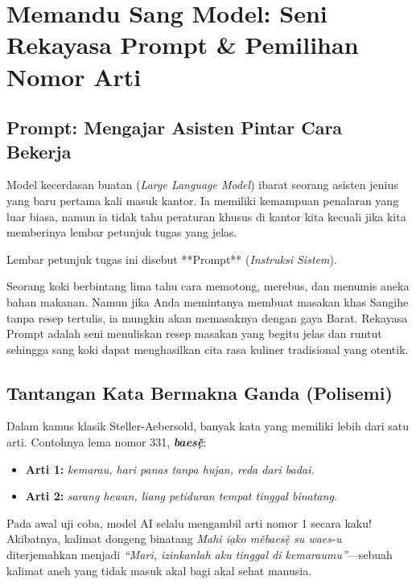 \chapter{Memandu Sang Model: Seni Rekayasa Prompt \& Pemilihan Nomor Arti}

\section{Prompt: Mengajar Asisten Pintar Cara Bekerja}
Model kecerdasan buatan (\textit{Large Language Model}) ibarat seorang asisten jenius yang baru pertama kali masuk kantor. Ia memiliki kemampuan penalaran yang luar biasa, namun ia tidak tahu peraturan khusus di kantor kita kecuali jika kita memberinya lembar petunjuk tugas yang jelas.

Lembar petunjuk tugas ini disebut **Prompt** (\textit{Instruksi Sistem}).

\begin{infobox}
Seorang koki berbintang lima tahu cara memotong, merebus, dan menumis aneka bahan makanan. Namun jika Anda memintanya membuat masakan khas Sangihe tanpa resep tertulis, ia mungkin akan memasaknya dengan gaya Barat. Rekayasa Prompt adalah seni menuliskan resep masakan yang begitu jelas dan runtut sehingga sang koki dapat menghasilkan cita rasa kuliner tradisional yang otentik.
\end{infobox}

\section{Tantangan Kata Bermakna Ganda (Polisemi)}
Dalam kamus klasik Steller-Aebersold, banyak kata yang memiliki lebih dari satu arti. Contohnya lema nomor 331, \textbf{\textit{baes\v{\d{e}}}}:
\begin{itemize}
    \item \textbf{Arti 1:} \textit{kemarau, hari panas tanpa hujan, reda dari badai.}
    \item \textbf{Arti 2:} \textit{sarang hewan, liang petiduran tempat tinggal binatang.}
\end{itemize}

Pada awal uji coba, model AI selalu mengambil arti nomor 1 secara kaku! Akibatnya, kalimat dongeng binatang \textit{Mahi i\d{a}ko m\v{e}baes\v{\d{e}} su waes-u} diterjemahkan menjadi \textit{“Mari, izinkanlah aku tinggal di kemaraumu”}---sebuah kalimat aneh yang tidak masuk akal bagi akal sehat manusia.


